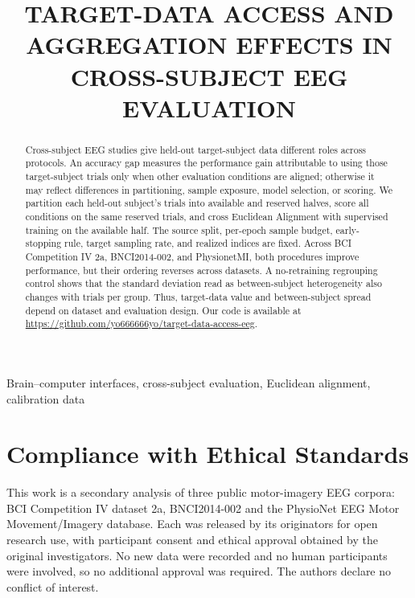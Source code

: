 \documentclass{article}
\title{TARGET-DATA ACCESS AND AGGREGATION EFFECTS IN CROSS-SUBJECT EEG EVALUATION}
\begin{document}
\ninept
\maketitle

\begin{abstract}
Cross-subject EEG studies give held-out target-subject data different roles across protocols. An accuracy gap measures the performance gain attributable to using those target-subject trials only when other evaluation conditions are aligned; otherwise it may reflect differences in partitioning, sample exposure, model selection, or scoring. We partition each held-out subject's trials into available and reserved halves, score all conditions on the same reserved trials, and cross Euclidean Alignment with supervised training on the available half. The source split, per-epoch sample budget, early-stopping rule, target sampling rate, and realized indices are fixed. Across BCI Competition IV 2a, BNCI2014-002, and PhysionetMI, both procedures improve performance, but their ordering reverses across datasets. A no-retraining regrouping control shows that the standard deviation read as between-subject heterogeneity also changes with trials per group. Thus, target-data value and between-subject spread depend on dataset and evaluation design. Our code is available at \url{https://github.com/yo666666yo/target-data-access-eeg}.
\end{abstract}

\begin{keywords}
Brain--computer interfaces, cross-subject evaluation, Euclidean alignment, calibration data
\end{keywords}


%




\section*{Compliance with Ethical Standards}
This work is a secondary analysis of three public motor-imagery EEG corpora: BCI Competition IV
dataset 2a, BNCI2014-002 and the PhysioNet EEG Motor Movement/Imagery database. Each was released by its originators for open research use, with participant consent and ethical approval obtained by the original investigators. No new data were recorded and no human participants were involved, so no additional approval was required. The authors declare no conflict of
interest.



\end{document}
